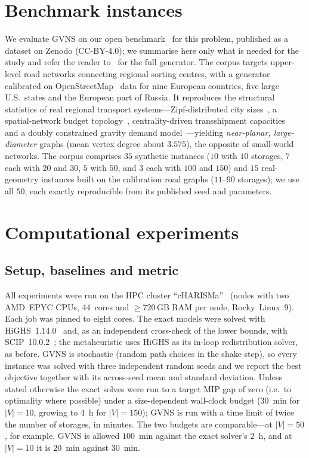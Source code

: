 \documentclass[runningheads]{llncs}
\begin{document}
\section{Benchmark instances}
\label{sec:data}

We evaluate GVNS on our open benchmark~\cite{benchmark,benchmark-data} for this
problem, published as a dataset on Zenodo (CC-BY-4.0); we summarise here only what
is needed for the study and refer the reader to~\cite{benchmark} for the full
generator. The corpus targets upper-level road networks connecting regional
sorting centres, with a generator calibrated on OpenStreetMap~\cite{osm} data for
nine European countries, five large U.S.\ states and the European part of Russia.
It reproduces the structural statistics of real regional transport
systems---Zipf-distributed city sizes~\cite{gabaix1999}, a spatial-network budget
topology~\cite{gastner2006}, centrality-driven transshipment
capacities~\cite{barthelemy2011,kirkley2018} and a doubly constrained gravity
demand model~\cite{wilson1967}---yielding \emph{near-planar, large-diameter}
graphs (mean vertex degree about $3.575$), the opposite of small-world networks.
The corpus comprises $35$ synthetic instances ($10$ with $10$ storages, $7$ each
with $20$ and $30$, $5$ with $50$, and $3$ each with $100$ and $150$) and $15$
real-geometry instances built on the calibration road graphs ($11$--$90$
storages); we use all $50$, each exactly reproducible from its published seed and
parameters.

\section{Computational experiments}
\label{sec:experiments}

\subsection{Setup, baselines and metric}
All experiments were run on the HPC cluster ``cHARISMa''~\cite{charisma} (nodes with two
AMD~EPYC CPUs, 44~cores and $\ge$720\,GB RAM per node, Rocky~Linux~9). Each job
was pinned to eight cores. The exact models were solved with
HiGHS~1.14.0~\cite{highs} and, as an independent cross-check of the lower
bounds, with SCIP~10.0.2~\cite{scip}; the metaheuristic uses HiGHS as its
in-loop redistribution solver, as before. GVNS is stochastic (random path
choices in the shake step), so every instance was solved with three independent
random seeds and we report the best objective together with its across-seed
mean and standard deviation. Unless stated otherwise the exact solves were run
to a target MIP gap of zero (i.e.\ to optimality where possible) under
a size-dependent wall-clock budget (30~min for $|V|=10$, growing to 4~h for
$|V|=150$); GVNS is run with a time limit of twice the number of storages, in
minutes. The two budgets are comparable---at $|V|=50$, for example, GVNS is
allowed $100$~min against the exact solver's $2$~h, and at $|V|=10$ it is
$20$~min against $30$~min.
\end{document}
